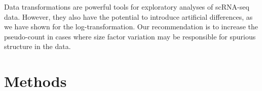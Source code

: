 \documentclass[10pt,letterpaper]{article}
\begin{document}
% 


Data transformations are powerful tools for exploratory analyses of scRNA-seq data.
However, they also have the potential to introduce artificial differences, as we have shown for the log-transformation.
Our recommendation is to increase the pseudo-count in cases where size factor variation may be responsible for spurious structure in the data.

\section{Methods}
\end{document}
